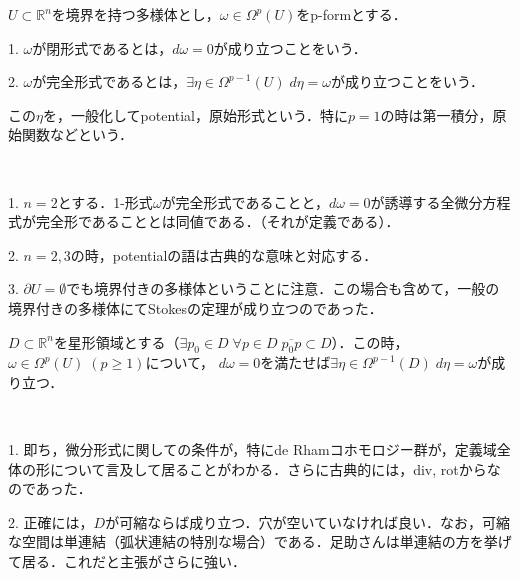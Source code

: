 \documentclass[uplatex, dvipdfmx]{jsreport}
\begin{document}
\begin{definition}[閉，完全，ポテンシャル]
    $U\subset\mathbb{R}^n$を境界を持つ多様体とし，$\omega\in\Omega^p(U)$をp-formとする．

    1. $\omega$が閉形式であるとは，$d\omega=0$が成り立つことをいう．

    2. $\omega$が完全形式であるとは，$\exists\eta\in\Omega^{p-1}(U)\;d\eta=\omega$が成り立つことをいう．

    この$\eta$を，一般化してpotential，原始形式という．特に$p=1$の時は第一積分，原始関数などという．
\end{definition}
\begin{remark}　

    1. $n=2$とする．1-形式$\omega$が完全形式であることと，$d\omega=0$が誘導する全微分方程式が完全形であることとは同値である．（それが定義である）．

    2. $n=2,3$の時，potentialの語は古典的な意味と対応する．

    3. $\partial U=\emptyset$でも境界付きの多様体ということに注意．この場合も含めて，一般の境界付きの多様体にてStokesの定理が成り立つのであった．
\end{remark}

\begin{theorem}[Poincaréの補題]
    $D\subset\mathbb{R}^n$を星形領域とする（$\exists p_0\in D\;\forall p\in D\; \overline{p_0p}\subset D$）．この時，$\omega\in\Omega^p(U)\;(p\ge 1)$について，
    $d\omega=0$を満たせば$\exists\eta\in\Omega^{p-1}(D)\;d\eta=\omega$が成り立つ．
\end{theorem}
\begin{remark}　

    1. 即ち，微分形式に関しての条件が，特にde Rhamコホモロジー群が，定義域全体の形について言及して居ることがわかる．さらに古典的には，div, rotからなのであった．

    2. 正確には，$D$が可縮ならば成り立つ．穴が空いていなければ良い．なお，可縮な空間は単連結（弧状連結の特別な場合）である．足助さんは単連結の方を挙げて居る．これだと主張がさらに強い．
\end{remark}
\end{document}
